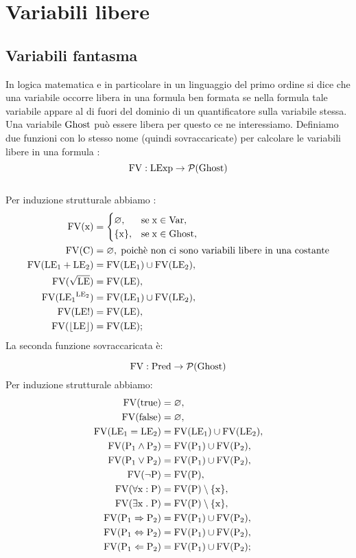 \documentclass[a4paper, 12pt, oneside,fleqn]{book}
\begin{document}
\chapter{Variabili libere}
\section{Variabili fantasma}
In logica matematica e in particolare in un linguaggio del primo ordine si dice che una variabile occorre libera in una formula ben formata se nella formula tale variabile appare al di fuori del dominio di un quantificatore sulla variabile stessa. Una variabile $\mathrm{Ghost}$ può essere libera per questo ce ne interessiamo.
Definiamo due funzioni con lo stesso nome (quindi sovraccaricate) per calcolare le variabili libere in una formula :
$$\mathrm{FV}\mathrel{:}\mathrm{LExp} \rightarrow \mathcal{P}(\mathrm{Ghost})$$\\
Per induzione strutturale abbiamo :
\begin{align}
\mathrm{FV}(\mathrm{x}) &= \begin{cases}
   \varnothing,&\text{se}\hspace{1mm} \mathrm{x} \in \mathrm{Var}, \\
   \{\mathrm{x}\},&\text{se}\hspace{1mm}\mathrm{x} \in \mathrm{Ghost},
   \end{cases} \\
\mathrm{FV}(\mathrm{C}) &= \varnothing,\hspace{1mm} \text{poichè non ci sono variabili libere in una costante}\\
\mathrm{FV}(\mathrm{LE}{_1} + \mathrm{LE}{_2}) &= \mathrm{FV}(\mathrm{LE}{_1}) \cup \mathrm{FV}(\mathrm{LE}{_2}),\\
\mathrm{FV}(\sqrt{\mathrm{LE}}) &= \mathrm{FV}(\mathrm{LE}),\\
\mathrm{FV}(\mathrm{LE}{_1}^{\mathrm{LE}_2}) &= \mathrm{FV}(\mathrm{LE}{_1}) \cup \mathrm{FV}(\mathrm{LE}_2),\\
\mathrm{FV}(\mathrm{LE}!) &= \mathrm{FV}(\mathrm{LE}),\\
\mathrm{FV}(\lfloor \mathrm{LE} \rfloor) &= \mathrm{FV}(\mathrm{LE});
\end{align}
La seconda funzione sovraccaricata è:

$$\mathrm{FV}\mathrel{:}\mathrm{Pred}\rightarrow\mathcal{P}(\mathrm{Ghost})$$
Per induzione strutturale abbiamo:
\begin{align}
\mathrm{FV}(\mathrm{true}) &= \varnothing,\\
\mathrm{FV}(\mathrm{false}) &= \varnothing,\\
\mathrm{FV}(\mathrm{LE}{_1} = \mathrm{LE}{_2}) &= \mathrm{FV}(\mathrm{LE}{_1}) \cup \mathrm{FV}(\mathrm{LE}{_2}),\\
\mathrm{FV}(\mathrm{P}{_1} \wedge \mathrm{P}{_2}) &= \mathrm{FV}(\mathrm{P}{_1}) \cup \mathrm{FV}(\mathrm{P}{_2}),\\
\mathrm{FV}(\mathrm{P}{_1} \vee \mathrm{P}{_2}) &= \mathrm{FV}(\mathrm{P}{_1}) \cup \mathrm{FV}(\mathrm{P}{_2}),\\
\mathrm{FV}(\neg \mathrm{P}) &= \mathrm{FV}(\mathrm{P}),\\
\mathrm{FV}(\forall\mathrm{x}\mathrel{:} \mathrm{P}) &= \mathrm{FV}(\mathrm{P})\setminus \{\mathrm{x}\},\\
\mathrm{FV}(\exists\mathrm{x}\mathrel{.} \mathrm{P}) &= \mathrm{FV}(\mathrm{P})\setminus \{\mathrm{x}\},\\
\mathrm{FV}(\mathrm{P}{_1} \Rightarrow \mathrm{P}{_2}) &= \mathrm{FV}(\mathrm{P}{_1}) \cup \mathrm{FV}(\mathrm{P}{_2}),\\
\mathrm{FV}(\mathrm{P}{_1} \Leftrightarrow \mathrm{P}{_2}) &= \mathrm{FV}(\mathrm{P}{_1}) \cup \mathrm{FV}(\mathrm{P}{_2}),\\
\mathrm{FV}(\mathrm{P}{_1} \Leftarrow \mathrm{P}{_2}) &= \mathrm{FV}(\mathrm{P}{_1}) \cup \mathrm{FV}(\mathrm{P}{_2});
\end{align}
\end{document}
